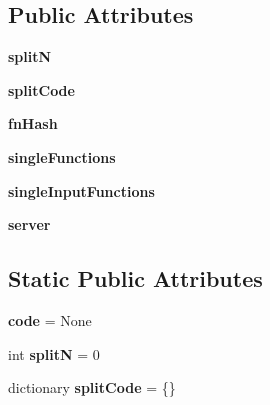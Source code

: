 \subsection*{Public Attributes}
\begin{DoxyCompactItemize}
\item 
\hypertarget{classcheshire3_1_1workflow_1_1_simple_workflow_abe900002bb4a90282e52b5df78cc0783}{{\bfseries split\-N}}\label{classcheshire3_1_1workflow_1_1_simple_workflow_abe900002bb4a90282e52b5df78cc0783}

\item 
\hypertarget{classcheshire3_1_1workflow_1_1_simple_workflow_afc33f362f72e878794a36f83764932ce}{{\bfseries split\-Code}}\label{classcheshire3_1_1workflow_1_1_simple_workflow_afc33f362f72e878794a36f83764932ce}

\item 
\hypertarget{classcheshire3_1_1workflow_1_1_simple_workflow_af603ded6c351500be30d2676ecd41e68}{{\bfseries fn\-Hash}}\label{classcheshire3_1_1workflow_1_1_simple_workflow_af603ded6c351500be30d2676ecd41e68}

\item 
\hypertarget{classcheshire3_1_1workflow_1_1_simple_workflow_afcc2b9baa260f1887a6e31c4ddeb1ce0}{{\bfseries single\-Functions}}\label{classcheshire3_1_1workflow_1_1_simple_workflow_afcc2b9baa260f1887a6e31c4ddeb1ce0}

\item 
\hypertarget{classcheshire3_1_1workflow_1_1_simple_workflow_ac6c552f463303c723a2ad16b1cf331c4}{{\bfseries single\-Input\-Functions}}\label{classcheshire3_1_1workflow_1_1_simple_workflow_ac6c552f463303c723a2ad16b1cf331c4}

\item 
\hypertarget{classcheshire3_1_1workflow_1_1_simple_workflow_a1464a8d77ea5b3fb63750deeacd6e92c}{{\bfseries server}}\label{classcheshire3_1_1workflow_1_1_simple_workflow_a1464a8d77ea5b3fb63750deeacd6e92c}

\end{DoxyCompactItemize}
\subsection*{Static Public Attributes}
\begin{DoxyCompactItemize}
\item 
\hypertarget{classcheshire3_1_1workflow_1_1_simple_workflow_acdfd091db5dc904f47c80432212658b2}{{\bfseries code} = None}\label{classcheshire3_1_1workflow_1_1_simple_workflow_acdfd091db5dc904f47c80432212658b2}

\item 
\hypertarget{classcheshire3_1_1workflow_1_1_simple_workflow_a16ef39031b46192f847a603c256d9fc8}{int {\bfseries split\-N} = 0}\label{classcheshire3_1_1workflow_1_1_simple_workflow_a16ef39031b46192f847a603c256d9fc8}

\item 
\hypertarget{classcheshire3_1_1workflow_1_1_simple_workflow_a955aee7ee809d66d0a92f3a6e6525e50}{dictionary {\bfseries split\-Code} = \{\}}\label{classcheshire3_1_1workflow_1_1_simple_workflow_a955aee7ee809d66d0a92f3a6e6525e50}

\end{DoxyCompactItemize}


